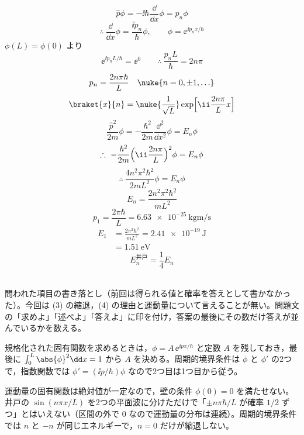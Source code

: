 \[ \hat{p}\phi=-\ii\hbar\frac{\dd}{\dd x}\phi=p_{n}\phi \]
\[ \therefore\ \frac{\dd}{\dd x}\phi=\frac{\ii p_{n}}{\hbar}\phi,\qquad\phi=\ee^{\ii p_{n}x/\hbar} \]
$\phi(L)=\phi(0)$ より
\[ \ee^{\ii p_{n}L/\hbar}=\ee^{0}\qquad\therefore\ \frac{p_{n}L}{\hbar}=2n\pi \]
\[ p_{n}=\frac{2n\pi\hbar}{L}\quad\nuke{n=0,\pm1,\ldots} \]
\[ \braket{x}{n}=\nuke{\frac{1}{\sqrt{L}}}\exp\Bigl[\ii\frac{2n\pi}{L}x\Bigr] \]
\[ \frac{\hat{p}^{2}}{2m}\phi=-\frac{\hbar^{2}}{2m}\frac{\dd^{2}}{\dd x^{2}}\phi=E_{n}\phi \]
\[ \therefore\ -\frac{\hbar^{2}}{2m}\Bigl(\ii\frac{2n\pi}{L}\Bigr)^{2}\phi=E_{n}\phi \]
\[ \therefore\ \frac{4n^{2}\pi^{2}\hbar^{2}}{2mL^{2}}\phi=E_{n}\phi \]
\[ E_{n}=\frac{2n^{2}\pi^{2}\hbar^{2}}{mL^{2}} \]
\[ p_{1}=\frac{2\pi\hbar}{L}=\qty{6.63e-25}{\kilogram\metre\per\second} \]
\begin{align*}
E_{1}&=\frac{2\pi^{2}\hbar^{2}}{mL^{2}}=\qty{2.41e-19}{\joule}\\
&=\qty{1.51}{\electronvolt}
\end{align*}
\[ E_{n}^{\text{井戸}}=\frac{1}{4}E_{n} \]
\ 
\item {} 問われた項目の書き落とし（前回は得られる値と確率を答えとして書かなかった）。今回は (3) の縮退，(4) の理由と運動量について言えることが無い。問題文の「求めよ」「述べよ」「答えよ」に印を付け，答案の最後にその数だけ答えが並んでいるかを数える。
\item 規格化された固有関数を求めるときは，$\phi=A\,\ee^{\ii px/\hbar}$ と定数 $A$ を残しておき，最後に $\int_{0}^{L}\abs{\phi}^{2}\dd x=1$ から $A$ を決める。周期的境界条件は $\phi$ と $\phi'$ の2つで，指数関数では $\phi'=(\ii p/\hbar)\phi$ なので2つ目は1つ目から従う。
\item 運動量の固有関数は絶対値が一定なので，壁の条件 $\phi(0)=0$ を満たせない。井戸の $\sin(n\pi x/L)$ を2つの平面波に分けただけで「$\pm n\pi\hbar/L$ が確率 $1/2$ ずつ」とはいえない（区間の外で $0$ なので運動量の分布は連続）。周期的境界条件では $n$ と $-n$ が同じエネルギーで，$n=0$ だけが縮退しない。
